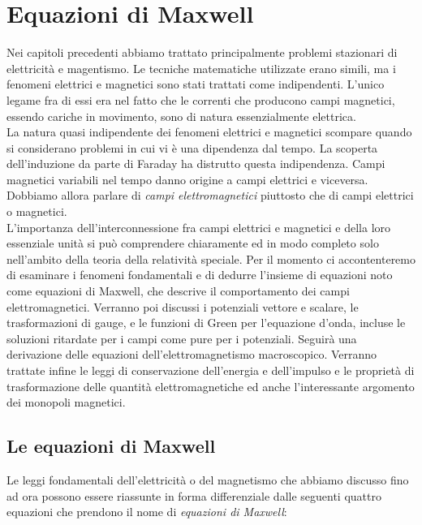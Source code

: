 \chapter{Equazioni di Maxwell}

Nei capitoli precedenti abbiamo trattato principalmente problemi stazionari di elettricità e magentismo. Le tecniche matematiche utilizzate erano simili, ma i fenomeni elettrici e magnetici sono stati trattati come indipendenti.
L'unico legame fra di essi era nel fatto che le correnti che producono campi magnetici, essendo cariche in movimento, sono di natura essenzialmente elettrica.\\

La natura quasi indipendente dei fenomeni elettrici e magnetici scompare quando si considerano problemi in cui vi è una dipendenza dal tempo. La scoperta dell'induzione da parte di Faraday ha distrutto questa indipendenza. 
Campi magnetici variabili nel tempo danno origine a campi elettrici e viceversa. 
Dobbiamo allora parlare di \emph{campi elettromagnetici} piuttosto che di campi elettrici o magnetici. \\

L'importanza dell'interconnessione fra campi elettrici e magnetici e della loro essenziale unità si può comprendere chiaramente ed in modo completo solo nell'ambito della teoria della relatività speciale.
Per il momento ci accontenteremo di esaminare i fenomeni fondamentali e di dedurre l'insieme di equazioni noto come equazioni di Maxwell, che descrive il comportamento dei campi elettromagnetici. Verranno poi discussi i potenziali vettore e scalare, le trasformazioni di gauge, e le funzioni di Green per l'equazione d'onda, incluse le soluzioni ritardate per i campi come pure per i potenziali. 
Seguirà una derivazione delle equazioni dell'elettromagnetismo macroscopico. Verranno trattate infine le leggi di conservazione dell'energia e dell'impulso e le proprietà di trasformazione delle quantità elettromagnetiche ed anche l'interessante argomento dei monopoli magnetici.

\section{Le equazioni di Maxwell}

Le leggi fondamentali dell'elettricità o del magnetismo che abbiamo discusso fino ad ora possono essere riassunte in forma differenziale dalle seguenti quattro equazioni che prendono il nome di \emph{equazioni di Maxwell}: 

